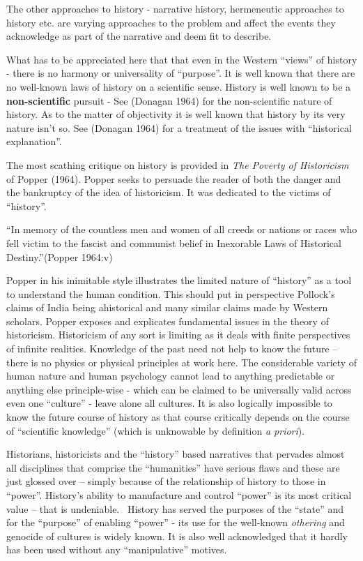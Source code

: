 The other approaches to history - narrative history, hermeneutic approaches to history etc. are varying approaches to the problem and affect the events they acknowledge as part of the narrative and deem fit to describe.

What has to be appreciated here that that even in the Western “views” of history - there is no harmony or universality of “purpose”. It is well known that there are no well-known laws of history on a scientific sense. History is well known to be a \textbf{non-scientific} pursuit - See (Donagan 1964) for the non-scientific nature of history. As to the matter of objectivity it is well known that history by its very nature isn’t so. See (Donagan 1964) for a treatment of the issues with “historical explanation”.

The most scathing critique on history is provided in \textit{The Poverty of Historicism} of Popper (1964). Popper seeks to persuade the reader of both the danger and the bankruptcy of the idea of historicism. It was dedicated to the victims of “history”.

\begin{myquote}
“In memory of the countless men and women of all creeds or nations or races who fell victim to the fascist and communist belief in Inexorable Laws of Historical Destiny.”\hfill (Popper 1964:v)
\end{myquote}

Popper in his inimitable style illustrates the limited nature of “history” as a tool to understand the human condition. This should put in perspective Pollock’s claims of India being ahistorical and many similar claims made by Western scholars. Popper exposes and explicates fundamental issues in the theory of historicism. Historicism of any sort is limiting as it deals with finite perspectives of infinite realities. Knowledge of the past need not help to know the future – there is no physics or physical principles at work here. The considerable variety of human nature and human psychology cannot lead to anything predictable or anything else principle-wise - which can be claimed to be universally valid across even one “culture” - leave alone all cultures. It is also logically impossible to know the future course of history as that course critically depends on the course of “scientific knowledge” (which is unknowable by definition \textit{a priori}).

Historians, historicists and the “history” based narratives that pervades almost all disciplines that comprise the “humanities” have serious flaws and these are just glossed over – simply because of the relationship of history to those in “power”. History’s ability to manufacture and control “power” is its most critical value – that is undeniable.  History has served the purposes of the “state” and for the “purpose” of enabling “power” - its use for the well-known \textit{othering} and genocide of cultures is widely known. It is also well acknowledged that it hardly has been used without any “manipulative” motives.

